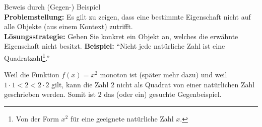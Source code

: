 \begin{howto}{Beweis durch (Gegen-) Beispiel}\\
 \textbf{Problemstellung:} Es gilt zu zeigen, dass eine bestimmte Eigenschaft nicht auf alle Objekte (aus einem Kontext) zutrifft.\\
   \textbf{Lösungsstrategie:} Geben Sie konkret ein Objekt an, welches die erwähnte Eigenschaft nicht besitzt.
   \tcblower
  \textbf{Beispiel:} ``Nicht jede natürliche Zahl ist eine Quadratzahl\footnote{Von der Form $x^2$ für eine geeignete natürliche Zahl $x$.}.''

Weil die Funktion $f(x)=x^2$ monoton ist (später mehr dazu) und weil $1\cdot1<2<2\cdot2$ gilt, kann die Zahl $2$ nicht als Quadrat von einer natürlichen Zahl geschrieben werden. Somit ist $2$ das (oder ein) gesuchte Gegenbeispiel.
\end{howto}



